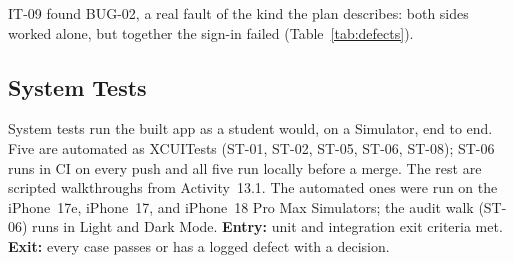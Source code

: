 \documentclass[12pt,letterpaper]{article}
\begin{document}
IT-09 found BUG-02, a real fault of the kind the plan describes: both sides worked
alone, but together the sign-in failed (Table~\ref{tab:defects}).

\subsection{System Tests}\label{sec:systemtests}
System tests run the built app as a student would, on a Simulator, end to end.
Five are automated as XCUITests (ST-01, ST-02, ST-05, ST-06, ST-08); ST-06 runs in
CI on every push and all five run locally before a merge. The rest are scripted
walkthroughs from Activity~13.1. The automated ones were run on the iPhone~17e, iPhone~17, and
iPhone~18 Pro Max Simulators; the audit walk (ST-06) runs in Light and Dark Mode.
\textbf{Entry:} unit and integration exit criteria met. \textbf{Exit:} every case
passes or has a logged defect with a decision.
\end{document}
